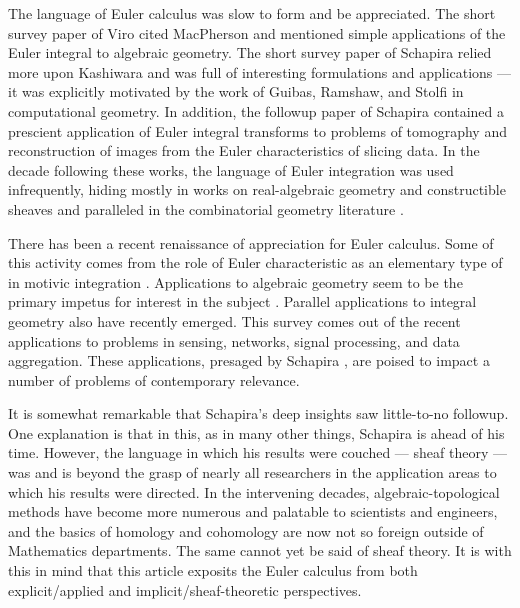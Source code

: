 \documentclass{psapm-l}
\theoremstyle{definition}
\theoremstyle{remark}
\numberwithin{equation}{section}
\begin{document}
The language of Euler calculus was slow to form and be appreciated. The short survey paper of Viro \cite{Viro} cited MacPherson and mentioned simple applications of the Euler integral to algebraic geometry. The short survey paper of Schapira \cite{Schapira:op} relied more upon Kashiwara \cite{Kashiwara,Kashiwara2} and was full of interesting formulations and applications --- it was explicitly motivated by the work of Guibas, Ramshaw, and Stolfi \cite{GRS} in computational geometry. In addition, the followup paper of Schapira \cite{Schapira:tom} contained a prescient application of Euler integral transforms to problems of tomography and reconstruction of images from the Euler characteristics of slicing data. In the decade following  these works, the language of Euler integration was used infrequently, hiding mostly in works on real-algebraic geometry and constructible sheaves and paralleled in the combinatorial geometry literature \cite{Groemer,Rota,Morelli,KR,Chen,Schanuel}.

There has been a recent renaissance of appreciation for Euler calculus. Some of this activity comes from the role of Euler characteristic as an elementary type of {{}} in motivic integration \cite{CL,GZ}. Applications to algebraic geometry seem to be the primary impetus for interest in the subject \cite{Viro,McCP,Kiritchenko,GZ}. Parallel applications to integral geometry also have recently emerged. This survey comes out of the recent applications \cite{BG:enum,BG:PNAS} to problems in sensing, networks, signal processing, and data aggregation. These applications, presaged by Schapira \cite{Schapira:tom}, are poised to impact a number of problems of contemporary relevance.

It is somewhat remarkable that Schapira's deep insights saw little-to-no followup. One explanation is that in this, as in many other things, Schapira is ahead of his time. However, the language in which his results were couched --- sheaf theory --- was and is beyond the grasp of nearly all researchers in the application areas to which his results were directed. In the intervening decades, algebraic-topological methods have become more numerous and palatable to scientists and engineers, and the basics of homology and cohomology are now not so foreign outside of Mathematics departments. The same cannot yet be said of sheaf theory. It is with this in mind that this article exposits the Euler calculus from both explicit/applied and implicit/sheaf-theoretic perspectives.
\end{document}
